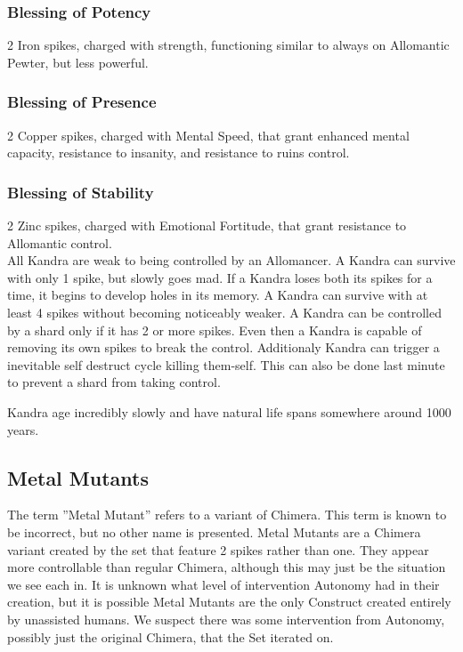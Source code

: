 \documentclass[conference]{IEEEtran}
\begin{document}
\subsubsection*{\textbf{Blessing of Potency}}
2 Iron spikes, charged with strength, functioning similar to always on Allomantic Pewter, but less powerful.\cite{WoF}\cite{kandra-blessing}\cite{HE-TB}
\subsubsection*{\textbf{Blessing of Presence}}
2 Copper spikes, charged with Mental Speed, that grant enhanced mental capacity, resistance to insanity, and resistance to ruins control.\cite{WoF}\cite{HoA-CH24}\cite{kandra-presence}\cite{kandra-blessing}\cite{HE-TB}
\subsubsection*{\textbf{Blessing of Stability}}
2 Zinc spikes, charged with Emotional Fortitude, that grant resistance to Allomantic control.\cite{WoF}\cite{kandra-blessing}\cite{HE-TB}\\

All Kandra are weak to being controlled by an Allomancer.\cite{WoA-CH40}
A Kandra can survive with only 1 spike,\cite{SoS-CH7} but slowly goes mad.  \cite{SoS-CH7}
If a Kandra loses both its spikes for a time, it begins to develop holes in its memory.\cite{BoM-CH30}
A Kandra can survive with at least 4 spikes without becoming noticeably weaker.\cite{HoA-CH20}
A Kandra can be controlled by a shard only if it has 2 or more spikes.\cite{SoS-CH7}\cite{SoS-CH26}  Even then a Kandra is capable of removing its own spikes to break the control.\cite{HoA-CH77}
Additionaly Kandra can trigger a inevitable self destruct cycle killing them-self.  This can also be done last minute to prevent a shard from taking control.\cite{SoS-CH26}

Kandra age incredibly slowly and have natural life spans somewhere around 1000 years.\cite{kandra-age} 

\subsection*{\textbf{Metal Mutants}}
The term ''Metal Mutant'' refers to a variant of Chimera.\cite{TLM-CH56}  This term is known to be incorrect, but no other name is presented.  Metal Mutants are a Chimera variant created by the set that feature 2 spikes rather than one.\cite{TLM-CH55}  They appear more controllable than regular Chimera, although this may just be the situation we see each in.  It is unknown what level of intervention Autonomy had in their creation, but it is possible Metal Mutants are the only Construct created entirely by unassisted humans.  We suspect there was some intervention from Autonomy, possibly just the original Chimera, that the Set iterated on.
\end{document}
